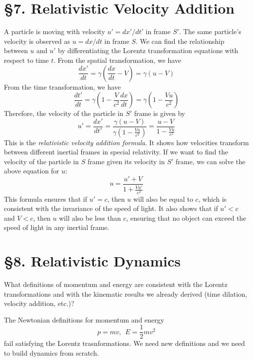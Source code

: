 \documentclass[12pt]{article}
\begin{document}
\section*{§7. Relativistic Velocity Addition}
A particle is moving with velocity $u'=dx'/dt'$ in frame $S'$. The same particle's velocity is observed as $u=dx/dt$ in frame $S$. We can find the relationship between $u$ and $u'$ by differentiating the Lorentz transformation equations with respect to time $t$. From the spatial transformation, we have
\[\frac{dx'}{dt} = \gamma\left(\frac{dx}{dt} - V\right) = \gamma(u - V)
\]From the time transformation, we have
\[\frac{dt'}{dt} = \gamma\left(1 - \frac{V}{c^2}\frac{dx}{dt}\right) = \gamma\left(1 - \frac{Vu}{c^2}\right)
\]Therefore, the velocity of the particle in $S'$ frame is given by
\[u' = \frac{dx'}{dt'} = \frac{\gamma(u - V)}{\gamma\left(1 - \frac{Vu}{c^2}\right)} = \frac{u - V}{1 - \frac{Vu}{c^2}} \]
This is the \textit{relativistic velocity addition formula}. It shows how velocities transform between different inertial frames in special relativity. If we want to find the velocity of the particle in $S$ frame given its velocity in $S'$ frame, we can solve the above equation for $u$:
\[u = \frac{u' + V}{1 + \frac{Vu'}{c^2}} \]
This formula ensures that if $u' = c$, then $u$ will also be equal to $c$, which is consistent with the invariance of the speed of light. It also shows that if $u' < c$ and $V < c$, then $u$ will also be less than $c$, ensuring that no object can exceed the speed of light in any inertial frame.

\section*{§8. Relativistic Dynamics}

What definitions of momentum and energy are consistent with the Lorentz transformations and with the kinematic results we already derived (time dilation, velocity addition, etc.)?

The Newtonian definitions for momentum and energy 
\[ 
p = mv, ~~E = \frac{1}{2}mv^2
\]
fail satisfying the Lorentz trasnformations. We need new definitions and we need to build dynamics from scratch.
\end{document}
